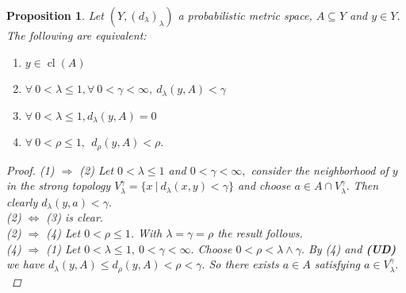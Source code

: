 \documentclass[10pt,a4paper]{amsart}
\newtheorem{proposition}{Proposition}
\DeclareMathOperator{\cl}{cl}
\renewcommand{\l}{\ensuremath{\lambda}}
\begin{document}
\begin{proposition}\label{equivtop}
Let $(Y, (d_\l)_\l)$ a probabilistic metric space, $A \subseteq Y$ and $y \in Y$.
The following are equivalent:
\begin{enumerate}
\item $y \in \cl(A)$
\item $\forall\  0< \l \leq 1, \forall  \ 0 < \gamma < \infty, \ d_\l(y,A) < \gamma$
\item $\forall\  0< \l \leq 1, d_\l(y,A) =0$
\item $\forall \ 0< \rho \leq 1, \  \ d_\rho(y,A) < \rho.$
\end{enumerate}
\begin{proof}
(1) $\Rightarrow$ (2) Let $0< \l \leq 1$ and $0< \gamma < \infty,$ consider the neighborhood of $y$ in the strong topology 
$V_\l^\gamma = \{ x \ | \ d_\l(x,y) < \gamma \}$ and choose $a \in A \cap V_\l^\gamma.$ Then clearly $d_\l(y,a) < \gamma.$\\
(2) $\Leftrightarrow$ (3) is clear.\\
(2) $\Rightarrow$ (4) Let $ 0< \rho \leq 1$. With $\l = \gamma = \rho$ the result follows.\\
(4) $\Rightarrow$ (1) Let  $0< \l \leq 1,  \ 0 < \gamma < \infty.$ Choose $0 < \rho < \l \wedge \gamma.$ By (4) and {\bf(UD)} we have $d_\l (y ,A) \leq d_\rho(y,A) < \rho <\gamma.$ So there exists $a \in A$ satisfying $a \in V_\l^\gamma.$

\end{proof}
\end{proposition}
\end{document}
